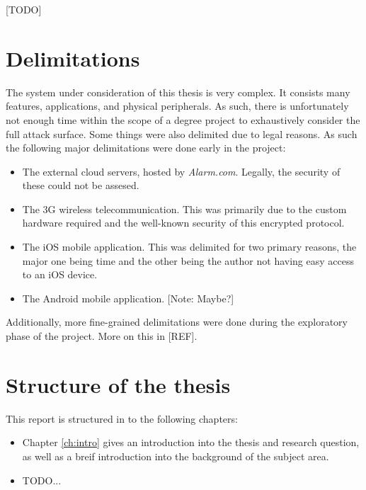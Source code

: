[TODO]

\section{Delimitations} \label{ch:intro:delimitations}
The system under consideration of this thesis is very complex. It consists many features, applications, and physical peripherals. As such, there is unfortunately not enough time within the scope of a degree project to exhaustively consider the full attack surface. Some things were also delimited due to legal reasons. As such the following major delimitations were done early in the project:

\begin{itemize}
    \item The external cloud servers, hosted by \textit{Alarm.com}. Legally, the security of these could not be assesed.
    \item The 3G wireless telecommunication. This was primarily due to the custom hardware required and the well-known security of this encrypted protocol.
    \item The iOS mobile application. This was delimited for two primary reasons, the major one being time and the other being the author not having easy access to an iOS device.
    \item The Android mobile application. [Note: Maybe?]
\end{itemize}

\noindent Additionally, more fine-grained delimitations were done during the exploratory phase of the project. More on this in [REF].

\section{Structure of the thesis} \label{ch:intro:structure}
This report is structured in to the following chapters:
\begin{itemize}
    \item Chapter \ref{ch:intro} gives an introduction into the thesis and research question, as well as a breif introduction into the background of the subject area.
    \item TODO...
\end{itemize}
